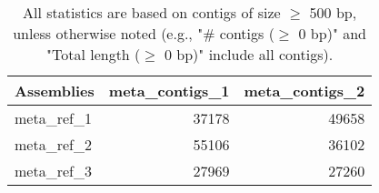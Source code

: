 \documentclass[12pt,a4paper]{article}
\begin{document}
\begin{table}[ht]
\begin{center}
\caption{All statistics are based on contigs of size $\geq$ 500 bp, unless otherwise noted (e.g., "\# contigs ($\geq$ 0 bp)" and "Total length ($\geq$ 0 bp)" include all contigs).}
\begin{tabular}{|l*{2}{|r}|}
\hline
Assemblies & meta\_contigs\_1 & meta\_contigs\_2 \\ \hline
meta\_ref\_1 & 37178 & 49658 \\ \hline
meta\_ref\_2 & 55106 & 36102 \\ \hline
meta\_ref\_3 & 27969 & 27260 \\ \hline
\end{tabular}
\end{center}
\end{table}
\end{document}
